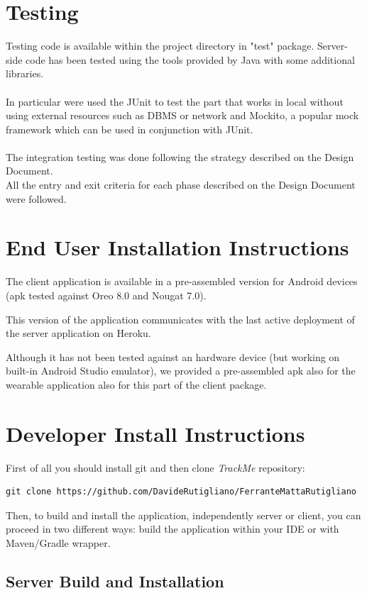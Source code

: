 \documentclass[a4paper]{article}
\begin{document}
\newpage
\section{Testing}
Testing code is available within the project directory in "test" package.
Server-side code has been tested using the tools provided by Java with some additional libraries.\\\\
In particular were used the JUnit to test the part that works in local without using external resources such as DBMS or network and Mockito, a popular mock framework which can be used in conjunction with JUnit.\\\\
The integration testing was done following the strategy described on the Design Document.\\
All the entry and exit criteria for each phase described on the Design Document were followed.

\section{End User Installation Instructions}
The client application is available in a pre-assembled version for Android devices (apk tested against Oreo 8.0 and Nougat 7.0).

This version of the application communicates with the last active deployment of the server application on Heroku.

Although it has not been tested against an hardware device (but working on built-in Android Studio emulator), we provided a pre-assembled apk also for the wearable application also for this part of the client package.

\newpage
\section{Developer Install Instructions}
First of all you should install git and then clone \textit{TrackMe} repository:
\begin{lstlisting}
git clone https://github.com/DavideRutigliano/FerranteMattaRutigliano
\end{lstlisting}

Then, to build and install the application, independently server or client, you can proceed in two different ways: build the application within your IDE or with Maven/Gradle wrapper.
\subsection{Server Build and Installation}
\end{document}
